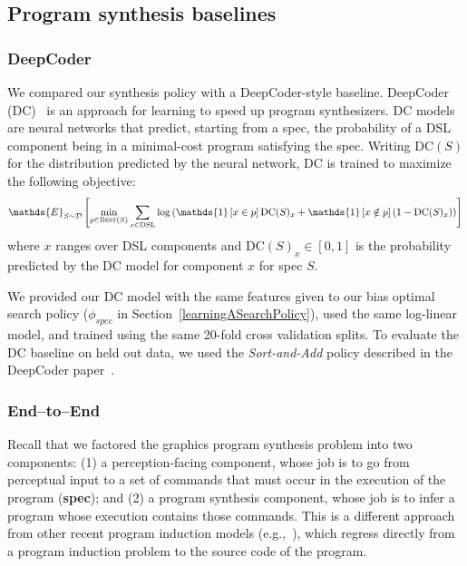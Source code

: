 \documentclass{article}
\newcommand{\expect}{\mathds{E}} %
\newcommand{\indicator}{\mathds{1}} %
\theoremstyle{definition}
\begin{document}
\subsection{Program synthesis baselines}
\subsubsection{DeepCoder}\label{dcAppendix}
We compared our synthesis policy with a DeepCoder-style baseline.
DeepCoder (DC)~\cite{BalGauBroetal16}
is an approach for learning to speed up program synthesizers.
DC models are neural networks that
predict, starting from a spec,
the probability of a DSL component being in a minimal-cost program satisfying the spec.
Writing $\text{DC}(S)$ for the distribution predicted by the neural network,
DC is trained to maximize  the following objective:
\begin{equation}
  \expect_{S\sim\mathcal{D}}\left[\min_{p\in \text{\textsc{Best}}(S)} \sum_{x\in \text{DSL}} \log \left(\indicator\left[x\in p \right] \text{DC}(S)_x + \indicator\left[x\notin p \right] (1 - \text{DC}(S)_x)\right)
    \right]
\end{equation}
where $x$ ranges over DSL components and $\text{DC}(S)_x\in \left[0,1 \right]$  is the probability predicted by the DC model for component $x$ for spec $S$.

We provided our DC model with the same features given to our bias optimal search policy ($\phi_{spec}$ in Section~\ref{learningASearchPolicy}), used the same log-linear model, and trained using the same 20-fold cross validation splits.
To evaluate the DC baseline on held out data,
we used the \emph{Sort-and-Add} policy described in the DeepCoder paper~\cite{BalGauBroetal16}.

\subsubsection{End--to--End}\label{eeAppendix}

Recall that we factored the graphics program synthesis problem into two components: (1) a perception-facing component, whose job is to go from perceptual input to a set of commands that must occur in the execution of the program (\textbf{spec}); and (2) a program synthesis component, whose job is to infer a program whose execution contains those commands. This is a different approach from other recent program induction models (e.g.,~\cite{devlin2017robustfill,nps}), which regress directly from a program induction problem to the source code of the program.
\end{document}
